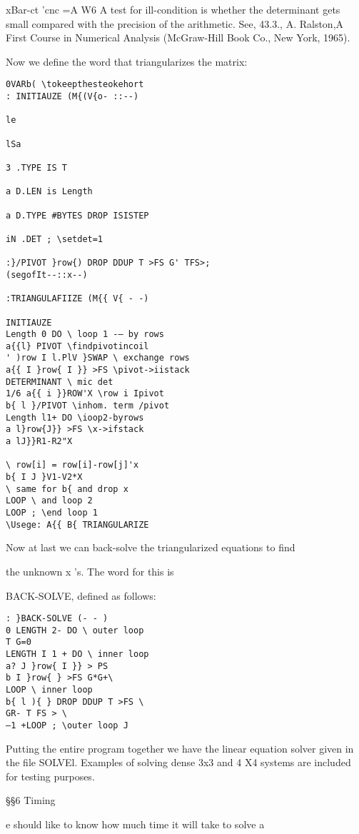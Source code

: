 {{{{{{{{{xBar-ct 'cnc =A W6
A test for ill-condition is whether the determinant gets small compared with the precision of the
arithmetic. See, 43.3., A. Ralston,A First Course in Numerical Analysis (McGraw-Hill Book Co.,
New York, 1965).


Now we define the word that triangularizes the matrix:
\begin{verbatim}
0VARb( \tokeepthesteokehort
: INITIAUZE (M{(V{o- ::--)

le

lSa

3 .TYPE IS T

a D.LEN is Length

a D.TYPE #BYTES DROP ISISTEP

iN .DET ; \setdet=1

:}/PIVOT }row{) DROP DDUP T >FS G' TFS>;
(segofIt--::x--)

:TRIANGULAFIIZE (M{{ V{ - -)

INITIAUZE
Length 0 DO \ loop 1 -— by rows
a{{l} PIVOT \findpivotincoil
' )row I l.PlV }SWAP \ exchange rows
a{{ I }row{ I }} >FS \pivot->iistack
DETERMINANT \ mic det
1/6 a{{ i }}ROW'X \row i Ipivot
b{ l }/PIVOT \inhom. term /pivot
Length l1+ DO \ioop2-byrows
a l}row{J}} >FS \x->ifstack
a lJ}}R1-R2"X

\ row[i] = row[i]-row[j]'x
b{ I J }V1-V2*X
\ same for b{ and drop x
LOOP \ and loop 2
LOOP ; \end loop 1
\Usege: A{{ B{ TRIANGULARIZE
\end{verbatim}

Now at last we can back-solve the triangularized equations to find

the unknown x 's. The word for this is }BACK-SOLVE, defined
as follows:


\begin{verbatim}
: }BACK-SOLVE (- - )
0 LENGTH 2- DO \ outer loop
T G=0
LENGTH I 1 + DO \ inner loop
a? J }row{ I }} > PS
b I }row{ } >FS G*G+\
LOOP \ inner loop
b{ l ){ } DROP DDUP T >FS \
GR- T FS > \
—1 +LOOP ; \outer loop J
\end{verbatim} 

Putting the entire program together we have the linear equation
solver given in the file SOLVEl. Examples of solving dense 3x3
and 4 X4 systems are included for testing purposes.

\S\S6 Timing

e should like to know how much time it will take to solve a

}}}}}}}}
